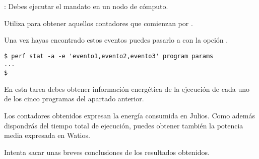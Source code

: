 : Debes ejecutar el mandato en un nodo de cómputo.

Utiliza  para obtener aquellos contadores que comienzan 
por .

Una vez hayas encontrado estos eventos puedes pasarlo a 
con la opción .

\begin{lstlisting}[style=terminal]
$ perf stat -a -e 'evento1,evento2,evento3' program params
...
$
\end{lstlisting}

En esta tarea debes obtener información energética de la ejecución de cada uno de los
cinco programas del apartado anterior.

Los contadores obtenidos expresan la energía consumida en Julios. Como además
dispondrás del tiempo total de ejecución, puedes obtener también la potencia
media expresada en Watios.

Intenta sacar unas breves conclusiones de los resultados obtenidos.
